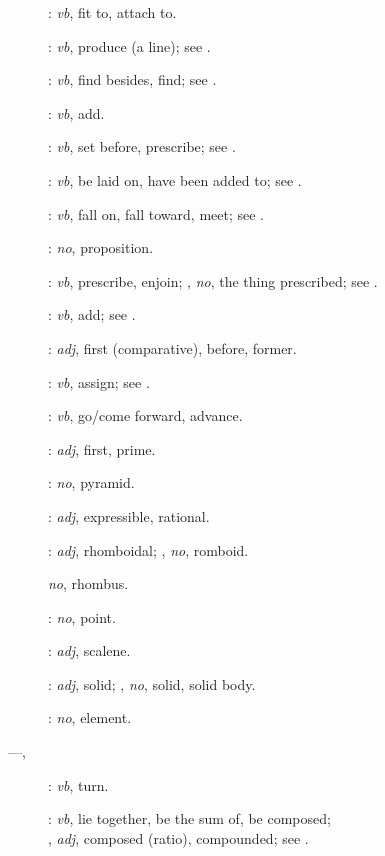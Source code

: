 {\begin{description}
\item[]: {\em vb}, fit to, attach to.
\item[]: {\em vb}, produce (a line); see .
\item[]: {\em vb}, find besides, find; see .
\item[]: {\em vb}, add.
\item[]: {\em vb}, set before, prescribe; see .
\item[]: {\em vb}, be laid on, have been added to; see .
\item[]: {\em vb}, fall on, fall toward, meet; see .
\item[]: {\em no}, proposition.
\item[]: {\em vb}, prescribe, enjoin; , {\em no}, the thing prescribed; see .
\item[]: {\em vb}, add; see .
\item[]: {\em adj}, first (comparative), before, former.
\item[]: {\em vb}, assign; see .
\item[]: {\em vb}, go/come forward, advance.
\item[]: {\em adj}, first, prime.
\item[]: {\em no}, pyramid.
\item[]: {\em adj}, expressible, rational.
\item[]: {\em adj}, rhomboidal; ,
{\em no}, romboid.
\item[] {\em no}, rhombus.
\item[]: {\em no}, point.
\item[]: {\em adj}, scalene.
\item[]: {\em adj}, solid; , {\em no}, solid, solid body.
\item[]: {\em no}, element.
\item[ ---, ]:
{\em vb}, turn.
\item[]: {\em vb}, lie together, be the sum of, be composed;\\ , {\em adj}, composed (ratio), compounded; see .

\end{description}}
